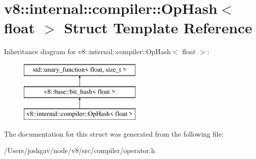 \hypertarget{structv8_1_1internal_1_1compiler_1_1_op_hash_3_01float_01_4}{}\section{v8\+:\+:internal\+:\+:compiler\+:\+:Op\+Hash$<$ float $>$ Struct Template Reference}
\label{structv8_1_1internal_1_1compiler_1_1_op_hash_3_01float_01_4}
Inheritance diagram for v8\+:\+:internal\+:\+:compiler\+:\+:Op\+Hash$<$ float $>$\+:\begin{figure}[H]
\begin{center}
\leavevmode
\includegraphics[height=3.000000cm]{structv8_1_1internal_1_1compiler_1_1_op_hash_3_01float_01_4}
\end{center}
\end{figure}


The documentation for this struct was generated from the following file\+:\begin{DoxyCompactItemize}
\item 
/\+Users/joshgav/node/v8/src/compiler/operator.\+h\end{DoxyCompactItemize}
